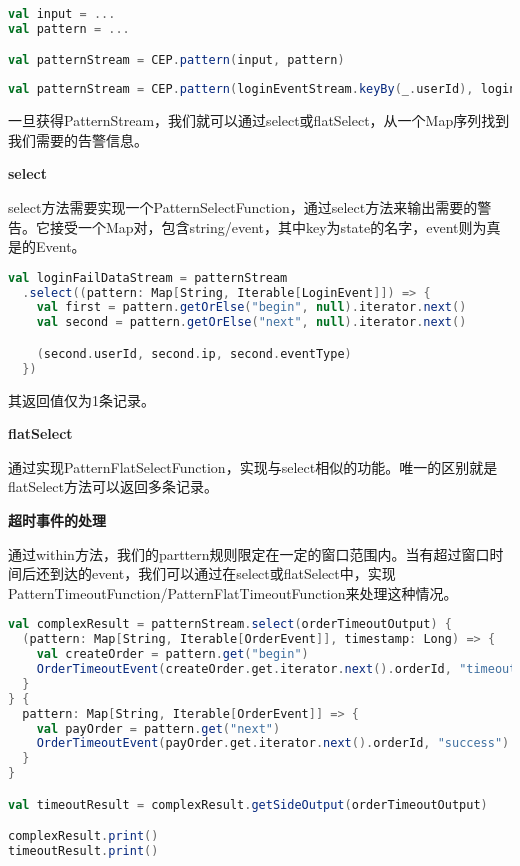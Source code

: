\documentclass[oneside]{ctexbook}
\begin{document}
\begin{lstlisting}[language=scala]
val input = ...
val pattern = ...

val patternStream = CEP.pattern(input, pattern)
\end{lstlisting}

\begin{lstlisting}[language=scala]
val patternStream = CEP.pattern(loginEventStream.keyBy(_.userId), loginFailPattern)
\end{lstlisting}

一旦获得PatternStream，我们就可以通过select或flatSelect，从一个Map序列找到我们需要的告警信息。

\textbf{select}

select方法需要实现一个PatternSelectFunction，通过select方法来输出需要的警告。它接受一个Map对，包含string/event，其中key为state的名字，event则为真是的Event。

\begin{lstlisting}[language=scala]
val loginFailDataStream = patternStream
  .select((pattern: Map[String, Iterable[LoginEvent]]) => {
    val first = pattern.getOrElse("begin", null).iterator.next()
    val second = pattern.getOrElse("next", null).iterator.next()

    (second.userId, second.ip, second.eventType)
  })
\end{lstlisting}

其返回值仅为1条记录。

\textbf{flatSelect}

通过实现PatternFlatSelectFunction，实现与select相似的功能。唯一的区别就是flatSelect方法可以返回多条记录。

\textbf{超时事件的处理}

通过within方法，我们的parttern规则限定在一定的窗口范围内。当有超过窗口时间后还到达的event，我们可以通过在select或flatSelect中，实现PatternTimeoutFunction/PatternFlatTimeoutFunction来处理这种情况。

\begin{lstlisting}[language=scala]
val complexResult = patternStream.select(orderTimeoutOutput) {
  (pattern: Map[String, Iterable[OrderEvent]], timestamp: Long) => {
    val createOrder = pattern.get("begin")
    OrderTimeoutEvent(createOrder.get.iterator.next().orderId, "timeout")
  }
} {
  pattern: Map[String, Iterable[OrderEvent]] => {
    val payOrder = pattern.get("next")
    OrderTimeoutEvent(payOrder.get.iterator.next().orderId, "success")
  }
}

val timeoutResult = complexResult.getSideOutput(orderTimeoutOutput)

complexResult.print()
timeoutResult.print()
\end{lstlisting}
\end{document}
